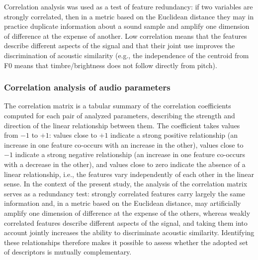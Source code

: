 \documentclass{article}
\begin{document}
Correlation analysis was used as a test of feature redundancy: if two variables are strongly correlated, then in a metric based on the Euclidean distance they may in practice duplicate information about a sound sample and amplify one dimension of difference at the expense of another. Low correlation means that the features describe different aspects of the signal and that their joint use improves the discrimination of acoustic similarity (e.g., the independence of the centroid from F0 means that timbre/brightness does not follow directly from pitch).

\subsubsection{Correlation analysis of audio parameters}
The correlation matrix is a tabular summary of the correlation coefficients computed for each pair of analyzed parameters, describing the strength and direction of the linear relationship between them. The coefficient takes values from $-1$ to $+1$: values close to $+1$ indicate a strong positive relationship (an increase in one feature co-occurs with an increase in the other), values close to $-1$ indicate a strong negative relationship (an increase in one feature co-occurs with a decrease in the other), and values close to zero indicate the absence of a linear relationship, i.e., the features vary independently of each other in the linear sense. In the context of the present study, the analysis of the correlation matrix serves as a redundancy test: strongly correlated features carry largely the same information and, in a metric based on the Euclidean distance, may artificially amplify one dimension of difference at the expense of the others, whereas weakly correlated features describe different aspects of the signal, and taking them into account jointly increases the ability to discriminate acoustic similarity. Identifying these relationships therefore makes it possible to assess whether the adopted set of descriptors is mutually complementary.
\end{document}
